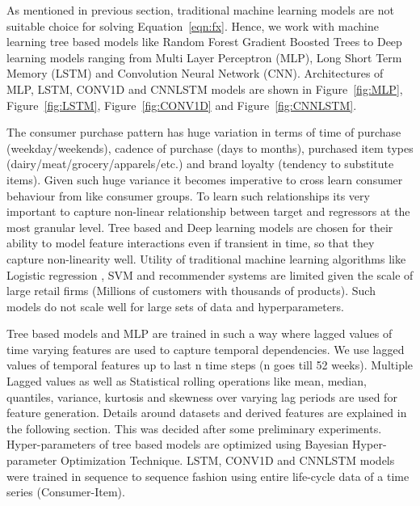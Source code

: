 As mentioned in previous section, traditional machine learning models are not suitable choice for solving Equation~\ref{eqn:fx}. 
Hence, we work with machine learning tree based models like Random Forest Gradient Boosted Trees 
to Deep learning models ranging from Multi Layer Perceptron (MLP), Long Short 
Term Memory (LSTM) and Convolution Neural Network (CNN). Architectures of MLP, LSTM, CONV1D and CNNLSTM 
models are shown in Figure~\ref{fig:MLP}, Figure~\ref{fig:LSTM}, Figure~\ref{fig:CONV1D}
and Figure~\ref{fig:CNNLSTM}.

The consumer purchase pattern has huge variation in terms of time of purchase (weekday/weekends), 
cadence of purchase (days to months), purchased item types (dairy/meat/grocery/apparels/etc.)
and brand loyalty (tendency to substitute items). Given such huge variance it becomes imperative 
to cross learn consumer behaviour from like consumer groups. To learn such relationships its very 
important to capture non-linear relationship between target and regressors at the most granular level.
Tree based and Deep learning models are chosen for their ability to model feature interactions even if transient in time, 
so that they capture non-linearity well. Utility of traditional machine learning algorithms like Logistic regression
, SVM and recommender systems are limited given the scale of large retail firms 
(Millions of customers with thousands of products). Such models do not scale well for large sets of data and hyperparameters.

Tree based models and MLP are trained in such a way where lagged values of time varying features are used
to capture temporal dependencies. We use lagged values of temporal features up to last n time steps (n goes till 52 weeks).
Multiple Lagged values as well as Statistical rolling operations like mean, median, quantiles, variance, kurtosis and 
skewness over varying lag periods are used for feature generation. Details around datasets and derived features are explained 
in the following section. This was decided after some preliminary experiments. Hyper-parameters of tree based models are optimized
using Bayesian Hyper-parameter Optimization Technique. LSTM, CONV1D and CNNLSTM models were trained in sequence to sequence 
fashion using entire life-cycle data of a time series (Consumer-Item).

